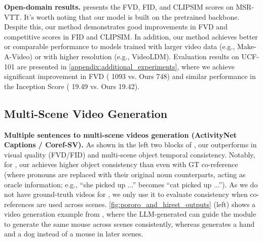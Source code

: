 \documentclass{article}
\begin{document}
\vspace{3pt}
\noindent\textbf{Open-domain results.}
 presents the FVD, FID, and CLIPSIM scores on MSR-VTT. 
It's worth noting that our model is built on the pretrained \modelscope{} backbone.
Despite this, our method demonstrates good improvements in FVD and competitive scores in FID and CLIPSIM.
In addition, our method achieves better or comparable performance to models trained with larger video data (e.g., Make-A-Video) or with higher resolution (e.g., VideoLDM). 
Evaluation results on UCF-101 are presented in \cref{appendix:additional_experiments}, where we achieve significant
improvement in FVD (\modelscope{} 1093 vs. Ours 748) and similar performance in the Inception Score (\modelscope{} 19.49 vs. Ours 19.42).










\subsection{Multi-Scene Video Generation}\label{sec:multi_scene_video_gen}

\noindent\textbf{Multiple sentences to multi-scene videos generation (ActivityNet Captions / Coref-SV).}
As shown in the left two blocks of ,
our \method{} outperforms \modelscope{} in visual quality (FVD/FID) and multi-scene object temporal consistency.
Notably, for \corefdata{}, our \method{} achieves higher object consistency than \modelscope{} even with GT co-reference 
(where pronouns are replaced with their original noun counterparts, acting as oracle information; e.g., ``she picked up ...'' becomes ``cat picked up ...'').
{As we do not have ground-truth videos for \corefdata{}, we only use it to evaluate consistency when co-references are used across scenes.}
\cref{fig:pororo_and_hirest_outputs} (left) shows a video generation example from \corefdata{},
where the LLM-generated \videoplan{} can guide the \videomodule{} module to generate the same mouse across scenes consistently,
whereas \modelscope{} generates a hand and a dog instead of a mouse in later scenes.
\end{document}

